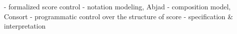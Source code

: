 
\begin{doublespacing}
\begin{markdown}
- formalized score control
- notation modeling, Abjad
- composition model, Consort
- programmatic control over the structure of score
- specification & interpretation
\end{markdown}
\end{doublespacing}